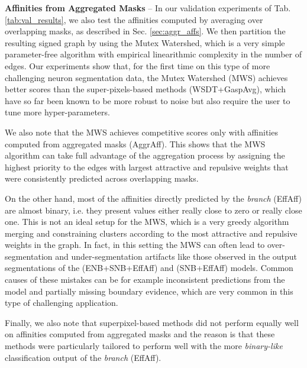 \textbf{Affinities from Aggregated Masks}  -- 
In our validation experiments of Tab. \ref{tab:val_results}, we also test the affinities computed by averaging over overlapping masks, as described in Sec. \ref{sec:aggr_affs}. We then partition the resulting signed graph by using the Mutex Watershed, which is a very simple parameter-free algorithm with empirical linearithmic complexity in the number of edges. 
Our experiments show that, for the first time on this type of more challenging neuron segmentation data, the Mutex Watershed (MWS) achieves better scores than the super-pixels-based methods (WSDT+GaspAvg), which have so far been known to be more robust to noise but also require the user to tune more hyper-parameters.   

We also note that the MWS achieves competitive scores only with affinities computed from aggregated masks (AggrAff).
This shows that the MWS algorithm can take full advantage of the \maskname aggregation process by assigning the highest priority to the edges with largest attractive and repulsive weights that were consistently predicted across overlapping masks.

On the other hand, most of the affinities directly predicted by the \emph{\sparseBr branch} (EffAff) are almost binary, i.e. they present values either really close to zero or really close one. %
This is not an ideal setup for the MWS, which is a very greedy algorithm merging and constraining clusters according to the most attractive and repulsive weights in the graph.
In fact, in this setting the MWS can often lead to over-segmentation and under-segmentation artifacts like those observed in the output segmentations of the (ENB+SNB+EffAff) and (SNB+EffAff) models. Common causes of these mistakes can be for example inconsistent predictions from the model and partially missing boundary evidence, which are very common in this type of challenging application. 

Finally, we also note that superpixel-based methods did not perform equally well on affinities computed from aggregated masks and the reason is that these methods were particularly tailored to perform well with the more \emph{binary-like} classification output of the \emph{\sparseBr branch} (EffAff). \\


